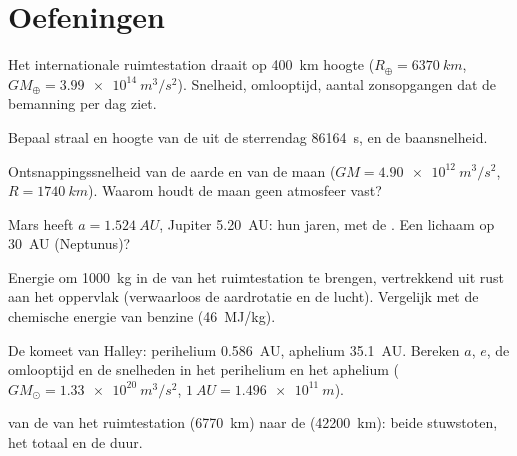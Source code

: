 \section{Oefeningen}

\begin{exercise}[$\star$]\label{exo:b1:central-forces:1}
Het internationale ruimtestation draait op \qty{400}{km} hoogte
($R_\oplus = \qty{6370}{km}$, $GM_\oplus = \qty{3.99e14}{m^3/s^2}$). Snelheid,
omlooptijd, aantal zonsopgangen dat de bemanning per dag ziet.
\end{exercise}

\begin{exercise}[$\star$]\label{exo:b1:central-forces:2}
Bepaal straal en hoogte van de  uit de sterrendag
\qty{86164}{s}, en de baansnelheid.
\end{exercise}

\begin{exercise}[$\star$]\label{exo:b1:central-forces:3}
Ontsnappingssnelheid van de aarde en van de maan ($GM = \qty{4.90e12}{m^3/s^2}$,
$R = \qty{1740}{km}$). Waarom houdt de maan geen atmosfeer vast?
\end{exercise}

\begin{exercise}[$\star$]\label{exo:b1:central-forces:4}
Mars heeft $a = \qty{1.524}{AU}$, Jupiter \qty{5.20}{AU}: hun jaren, met
de . Een lichaam op \qty{30}{AU} (Neptunus)?
\end{exercise}

\begin{exercise}[$\star\star$]\label{exo:b1:central-forces:5}
Energie om \qty{1000}{kg} in de  van het ruimtestation te brengen, vertrekkend
uit rust aan het oppervlak (verwaarloos de aardrotatie en de lucht). Vergelijk
met de chemische energie van benzine (\qty{46}{MJ/kg}).
\end{exercise}

\begin{exercise}[$\star\star$]\label{exo:b1:central-forces:6}
De komeet van Halley: perihelium \qty{0.586}{AU}, aphelium \qty{35.1}{AU}.
Bereken $a$, $e$, de omlooptijd en de snelheden in het perihelium en het aphelium
($GM_\odot = \qty{1.33e20}{m^3/s^2}$, $\qty{1}{AU} = \qty{1.496e11}{m}$).
\end{exercise}

\begin{exercise}[$\star\star$]\label{exo:b1:central-forces:7}
 van de  van het ruimtestation (\qty{6770}{km}) naar de
 (\qty{42200}{km}): beide stuwstoten, het totaal en de duur.
\end{exercise}

